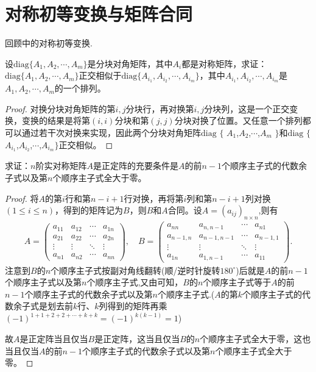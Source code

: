 \documentclass[../../main.tex]{subfiles}
\begin{document}
\section{对称初等变换与矩阵合同}

回顾中的对称初等变换.

\begin{proposition}\label{proposition:分块对称准对角阵正交相似于其任意排列}
设\(\mathrm{diag}\{A_1,A_2,\cdots,A_m\}\)是分块对角矩阵，其中\(A_i\)都是对称矩阵，求证：\(\mathrm{diag}\{A_1,A_2,\cdots,A_m\}\)正交相似于\(\mathrm{diag}\{A_{i_1},A_{i_2},\cdots,A_{i_m}\}\)，其中\(A_{i_1},A_{i_2},\cdots,A_{i_m}\)是\(A_1,A_2,\cdots,A_m\)的一个排列。
\end{proposition}
\begin{proof}
对换分块对角矩阵的第\(i,j\)分块行，再对换第\(i,j\)分块列，这是一个正交变换，变换的结果是将第\((i,i)\)分块和第\((j,j)\)分块对换了位置。又任意一个排列都可以通过若干次对换来实现，因此两个分块对角矩阵$\mathrm{diag}$ $\{$ $A_1$,$A_2$,$\cdots$,$A_m$ $\}$和$\mathrm{diag}$ $\{$ $A_{i_1}$,$A_{i_2}$,$\cdots$,$A_{i_m}\}$正交相似。
\end{proof}

\begin{proposition}
求证：\(n\)阶实对称矩阵\(A\)是正定阵的充要条件是\(A\)的前\(n - 1\)个顺序主子式的代数余子式以及第\(n\)个顺序主子式全大于零。
\end{proposition}
\begin{proof}
将\(A\)的第\(i\)行和第\(n - i + 1\)行对换，再将第\(i\)列和第\(n - i + 1\)列对换\((1\leqslant  i\leqslant  n)\)，得到的矩阵记为\(B\)，则\(B\)和\(A\)合同。设$A=(a_{ij})_{n\times n}$,则有
\begin{align*}
A=
\begin{pmatrix}
a_{11} & a_{12} & \cdots & a_{1n} \\
a_{21} & a_{22} & \cdots & a_{2n} \\
\vdots & \vdots & \ddots & \vdots \\
a_{n1} & a_{n2} & \cdots & a_{nn}
\end{pmatrix},\quad
B=
\begin{pmatrix}
a_{nn} & a_{n,n-1} & \cdots & a_{n1} \\
a_{n-1,n} & a_{n-1,n-1} & \cdots & a_{n-1,1} \\
\vdots & \vdots & \ddots & \vdots \\
a_{1n} & a_{1,n-1} & \cdots & a_{11}
\end{pmatrix}.
\end{align*}
注意到\(B\)的\(n\)个顺序主子式按副对角线翻转(顺/逆时针旋转$180^{\circ}$)后就是\(A\)的前\(n - 1\)个顺序主子式以及第\(n\)个顺序主子式,又由可知，\(B\)的\(n\)个顺序主子式等于\(A\)的前\(n - 1\)个顺序主子式的代数余子式以及第\(n\)个顺序主子式.($A$的第$k$个顺序主子式的代数余子式是划去前$k$行、$k$列得到的矩阵再乘$(-1)^{1+1+2+2+\cdots+k+k}=(-1)^{k(k-1)}=1$)

故\(A\)是正定阵当且仅当\(B\)是正定阵，这当且仅当\(B\)的\(n\)个顺序主子式全大于零，这也当且仅当\(A\)的前\(n - 1\)个顺序主子式的代数余子式以及第\(n\)个顺序主子式全大于零。
\end{proof}
\end{document}
